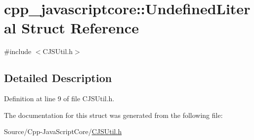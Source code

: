 \hypertarget{structcpp__javascriptcore_1_1_undefined_literal}{}\section{cpp\+\_\+javascriptcore\+:\+:Undefined\+Literal Struct Reference}
\label{structcpp__javascriptcore_1_1_undefined_literal}


{\ttfamily \#include $<$C\+J\+S\+Util.\+h$>$}



\subsection{Detailed Description}


Definition at line 9 of file C\+J\+S\+Util.\+h.



The documentation for this struct was generated from the following file\+:\begin{DoxyCompactItemize}
\item 
Source/\+Cpp-\/\+Java\+Script\+Core/\mbox{\hyperlink{_c_j_s_util_8h}{C\+J\+S\+Util.\+h}}\end{DoxyCompactItemize}
